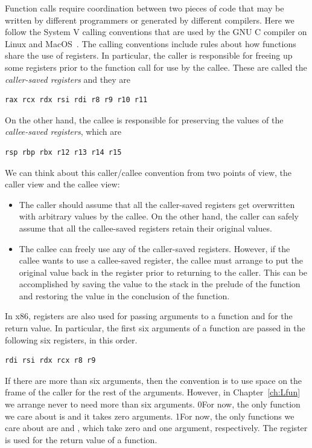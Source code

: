 \documentclass[7x10,nocrop]{TimesAPriori_MIT}%
\def\racketEd{0}
\def\pythonEd{1}
\def\edition{0}
\newcommand{\racket}[1]{{\if\edition\racketEd{#1}\fi}}
\newcommand{\python}[1]{{\if\edition\pythonEd #1\fi}}
\begin{document}
Function calls require coordination between two pieces of code that
may be written by different programmers or generated by different
compilers. Here we follow the System V calling conventions that are
used by the GNU C compiler on Linux and
MacOS~\citep{Bryant:2005aa,Matz:2013aa}.
%
The calling conventions include rules about how functions share the
use of registers. In particular, the caller is responsible for freeing
up some registers prior to the function call for use by the callee.
These are called the \emph{caller-saved registers}
and they are
\begin{lstlisting}
rax rcx rdx rsi rdi r8 r9 r10 r11
\end{lstlisting}
On the other hand, the callee is responsible for preserving the values
of the \emph{callee-saved registers}, 
which are
\begin{lstlisting}
rsp rbp rbx r12 r13 r14 r15
\end{lstlisting}

We can think about this caller/callee convention from two points of
view, the caller view and the callee view:
\begin{itemize}
\item The caller should assume that all the caller-saved registers get
  overwritten with arbitrary values by the callee.  On the other hand,
  the caller can safely assume that all the callee-saved registers
  retain their original values.
\item The callee can freely use any of the caller-saved registers.
  However, if the callee wants to use a callee-saved register, the
  callee must arrange to put the original value back in the register
  prior to returning to the caller. This can be accomplished by saving
  the value to the stack in the prelude of the function and restoring
  the value in the conclusion of the function.
\end{itemize}

In x86, registers are also used for passing arguments to a function
and for the return value.  In particular, the first six arguments of a
function are passed in the following six registers, in this order.
\begin{lstlisting}
rdi rsi rdx rcx r8 r9
\end{lstlisting}
If there are more than six arguments, then the convention is to use
space on the frame of the caller for the rest of the
arguments. However, in Chapter~\ref{ch:Lfun} we arrange never to
need more than six arguments.
%
\racket{For now, the only function we care about is 
  and it takes zero arguments.}
%
\python{For now, the only functions we care about are \code{read\_int}
  and \code{print\_int}, which take zero and one argument, respectively.}
%
The register  is used for the return value of a function.
\end{document}
